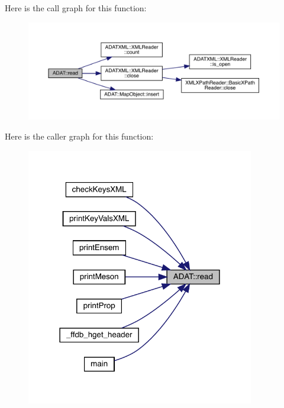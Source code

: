 Here is the call graph for this function\+:\nopagebreak
\begin{figure}[H]
\begin{center}
\leavevmode
\includegraphics[width=350pt]{d5/d0d/namespaceADAT_ab1cb4aab951dd138f8f0a73f5c3ead6d_cgraph}
\end{center}
\end{figure}
Here is the caller graph for this function\+:\nopagebreak
\begin{figure}[H]
\begin{center}
\leavevmode
\includegraphics[width=282pt]{d5/d0d/namespaceADAT_ab1cb4aab951dd138f8f0a73f5c3ead6d_icgraph}
\end{center}
\end{figure}
\mbox{\label{namespaceADAT_a38920c20e5e4ccb234f9a05e436a4faa}} 
